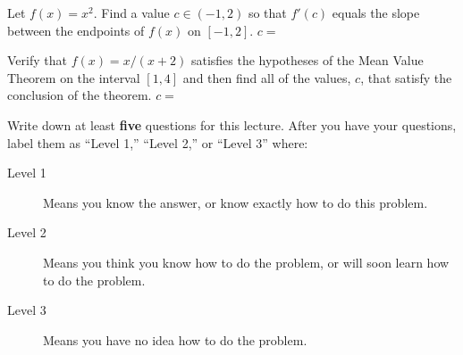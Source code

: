 \documentclass{ximera}
\begin{document}
\begin{question} Let $f(x) = x^2$.
  Find a value $c\in (-1,2)$ so that $f'(c)$ equals the slope between
  the endpoints of $f(x)$ on $[-1,2]$.  $c=$
\end{question}

\begin{question}
Verify that $f(x) = x/(x+2)$ satisfies the hypotheses of the Mean
Value Theorem on the interval $[1,4]$ and then find all of the values,
$c$, that satisfy the conclusion of the theorem.
$c=$
\end{question}

\begin{question}
Write down at least \textbf{five} questions for this lecture. After
you have your questions, label them as ``Level 1,'' ``Level 2,'' or
``Level 3'' where:
\begin{description}
\item[Level 1] Means you know the answer, or know exactly how to do this problem.
\item[Level 2] Means you think you know how to do the problem, or will soon learn how to do the problem.
\item[Level 3] Means you have no idea how to do the problem. 
\end{description}
  \begin{freeResponse}
  \end{freeResponse}
\end{question}
\end{document}
